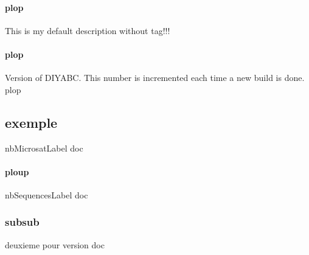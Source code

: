 \documentclass[12pt,a4paper]{article}
\begin{document}
        \paragraph{plop}
        \label{doc_versionLabel+++plop}
        This is my default description without tag!!!

        \paragraph{plop}
        \label{doc_versionLabel+++plop+++plap}
        Version of DIYABC. This number is incremented each time a new build is done.
        plop

        \subsection{exemple}
        \label{doc_nbMicrosatLabel}
        nbMicrosatLabel doc
            \paragraph{ploup}
            \label{doc_nbSequencesLabel}
            nbSequencesLabel doc

            \subsubsection{subsub}
            \label{doc_versionLabel+++plip}
            deuxieme pour version doc
\end{document}
